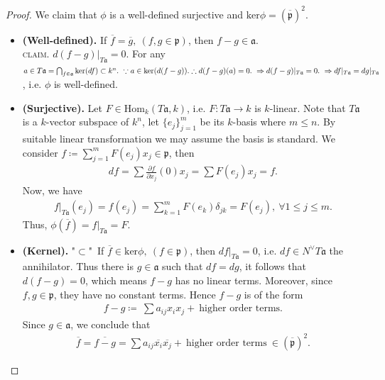 \documentclass[12pt,a4paper,footinclude=true,headinclude=true]{scrbook} %
\begin{document}
\begin{proof}
    We claim that $\phi$ is a well-defined surjective and $\mathrm{ker}\phi=(\overline{\mathfrak{p}})^2$.\\
    \begin{itemize}
        \item \textbf{(Well-defined).} If $\overline{f}=\overline{g},\ (f,g\in\mathfrak{p})$, then $f-g\in\mathfrak{a}$.\\ \textsc{claim.} $d(f-g)|_{T\mathfrak{a}}=0$. For any $a\in T\mathfrak{a}=\bigcap_{f\in\mathfrak{a}}\mathrm{ker}(df)\subset k^n.\ \because a\in\mathrm{ker}(d(f-g)).\\ \therefore d(f-g)(a)=0.\ \Rightarrow d(f-g)|_{T\mathfrak{a}}=0.\ \Rightarrow df|_{T\mathfrak{a}}=dg|_{T\mathfrak{a}}$, i.e. $\phi$ is well-defined. 
        \item \textbf{(Surjective).} Let $F\in\mathrm{Hom}_k(T\mathfrak{a},k)$, i.e. $F:T\mathfrak{a}\to k$ is $k$-linear. Note that $T\mathfrak{a}$ is a $k$-vector subspace of $k^n$, let $\{e_j\}_{j=1}^m$ be its $k$-basis where $m\leq n$. By suitable linear transformation we may assume the basis is standard. We consider $f\coloneqq\sum_{j=1}^mF(e_j)x_j\in\mathfrak{p}$, then
        \begin{align*}
            df=\sum \tfrac{\partial f}{\partial x_j}(0)x_j=\sum F(e_j)x_j=f.
        \end{align*}
        Now, we have
        \begin{align*}
            f|_{T\mathfrak{a}}(e_j)=f(e_j)=\sum_{k=1}^mF(e_k)\delta_{jk}=F(e_j),\ \forall 1\leq j\leq m.
        \end{align*}
        Thus, $\phi(\overline{f})=f|_{T\mathfrak{a}}=F$.
        \item \textbf{(Kernel).} "$\subset$"\ If $\overline{f}\in\mathrm{ker}\phi,\ (f\in\mathfrak{p})$, then $df|_{T\mathfrak{a}}=0$, i.e. $df\in N^\vee T\mathfrak{a}$ the annihilator. Thus there is $g\in\mathfrak{a}$ such that $df=dg$, it follows that $d(f-g)=0$, which means $f-g$ has no linear terms. Moreover, since $f,g\in\mathfrak{p}$, they have no constant terms. Hence $f-g$ is of the form
        \begin{align*}
            f-g\coloneqq\ \sum a_{ij}x_ix_j+\ \text{higher order terms}.
        \end{align*}
        Since $g\in\mathfrak{a}$, we conclude that
        \begin{align*}
            \overline{f}=\overline{f-g}=\sum a_{ij}\overline{x_i}\overline{x_j}+\ \text{higher order terms}\ \in(\overline{\mathfrak{p}})^2.

\end{align*}
\end{itemize}
\end{proof}
\end{document}
